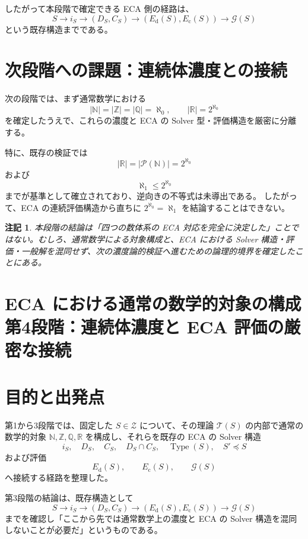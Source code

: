 \documentclass[a4paper,11pt]{article}
\newtheorem{remark}[definition]{注記}
\newcommand{\N}{\mathbb{N}}
\newcommand{\Z}{\mathbb{Z}}
\newcommand{\Q}{\mathbb{Q}}
\newcommand{\R}{\mathbb{R}}
\newcommand{\SubSolver}{\preceq}
\newcommand{\Type}{\operatorname{Type}}
\newcommand{\Zset}{\mathcal{Z}}
\begin{document}
したがって本段階で確定できる ECA 側の経路は、
\[
\boxed{
S
\longrightarrow
i_S
\longrightarrow
(D_S,C_S)
\longrightarrow
(E_{\mathrm{d}}(S),E_{\mathrm{c}}(S))
\longrightarrow
\mathcal G(S)
}
\]
という既存構造までである。

\section{次段階への課題：連続体濃度との接続}
次の段階では、まず通常数学における
\[
|\N|=|\Z|=|\Q|=\aleph_0,
\qquad
|\R|=2^{\aleph_0}
\]
を確定したうえで、これらの濃度と ECA の Solver 型・評価構造を厳密に分離する。

特に、既存の検証では
\[
|\R|=|\mathcal P(\N)|=2^{\aleph_0}
\]
および
\[
\aleph_1\le 2^{\aleph_0}
\]
までが基準として確立されており、逆向きの不等式は未導出である。
したがって、ECA の連続評価構造から直ちに $2^{\aleph_0}=\aleph_1$ を結論することはできない。

\begin{remark}
本段階の結論は「四つの数体系の ECA 対応を完全に決定した」ことではない。むしろ、通常数学による対象構成と、ECA における Solver 構造・評価・一般解を混同せず、次の濃度論的検証へ進むための論理的境界を確定したことにある。
\end{remark}


\section{ECA における通常の数学的対象の構成 \large{第4段階：連続体濃度と ECA 評価の厳密な接続}}


\section{目的と出発点}

第1から3段階では、固定した $S\in\Zset$ について、その理論 $\mathcal{T}(S)$ の内部で通常の数学的対象 $\N,\Z,\Q,\R$ を構成し、それらを既存の ECA の Solver 構造
\[
i_S,\quad D_S,\quad C_S,\quad D_S\cap C_S,\quad
\Type(S),\quad S'\SubSolver S
\]
および評価
\[
E_{\mathrm{d}}(S),\qquad E_{\mathrm c}(S),\qquad \mathcal G(S)
\]
へ接続する経路を整理した。

第3段階の結論は、既存構造として
\[
\boxed{
S
\longrightarrow
i_S
\longrightarrow
(D_S,C_S)
\longrightarrow
(E_{\mathrm{d}}(S),E_{\mathrm c}(S))
\longrightarrow
\mathcal G(S)
}
\]
までを確認し「ここから先では通常数学上の濃度と ECA の Solver 構造を混同しないことが必要だ」というものである。
\end{document}
